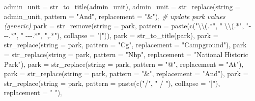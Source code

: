 \documentclass[
]{book}
\newenvironment{Shaded}{\begin{snugshade}}{\end{snugshade}}
\newcommand{\AttributeTok}[1]{\textcolor[rgb]{0.77,0.63,0.00}{#1}}
\newcommand{\CommentTok}[1]{\textcolor[rgb]{0.56,0.35,0.01}{\textit{#1}}}
\newcommand{\FunctionTok}[1]{\textcolor[rgb]{0.00,0.00,0.00}{#1}}
\newcommand{\NormalTok}[1]{#1}
\newcommand{\SpecialCharTok}[1]{\textcolor[rgb]{0.00,0.00,0.00}{#1}}
\newcommand{\StringTok}[1]{\textcolor[rgb]{0.31,0.60,0.02}{#1}}
\begin{document}
\begin{Shaded}
\begin{Highlighting}[]
    \AttributeTok{admin\_unit =} \FunctionTok{str\_to\_title}\NormalTok{(admin\_unit),}
    \AttributeTok{admin\_unit =} \FunctionTok{str\_replace}\NormalTok{(}\AttributeTok{string =}\NormalTok{ admin\_unit,}
                             \AttributeTok{pattern =} \StringTok{"And"}\NormalTok{,}
                             \AttributeTok{replacement =} \StringTok{"\&"}\NormalTok{),}
    \CommentTok{\# update park values (generic)}
    \AttributeTok{park =} \FunctionTok{str\_remove}\NormalTok{(}\AttributeTok{string =}\NormalTok{ park,}
                      \AttributeTok{pattern =} \FunctionTok{paste}\NormalTok{(}\FunctionTok{c}\NormalTok{(}\StringTok{"}\SpecialCharTok{\textbackslash{}\textbackslash{}}\StringTok{(.*"}\NormalTok{, }\StringTok{" }\SpecialCharTok{\textbackslash{}\textbackslash{}}\StringTok{(.*"}\NormalTok{,}
                                        \StringTok{"{-}{-}{-}.*"}\NormalTok{, }\StringTok{" {-}{-}{-}.*"}\NormalTok{,}
                                        \StringTok{",.*"}\NormalTok{), }\AttributeTok{collapse =} \StringTok{"|"}\NormalTok{)),}
    \AttributeTok{park =} \FunctionTok{str\_to\_title}\NormalTok{(park),}
    \AttributeTok{park =} \FunctionTok{str\_replace}\NormalTok{(}\AttributeTok{string =}\NormalTok{ park,}
                       \AttributeTok{pattern =} \StringTok{"Cg"}\NormalTok{,}
                       \AttributeTok{replacement =} \StringTok{"Campground"}\NormalTok{),}
    \AttributeTok{park =} \FunctionTok{str\_replace}\NormalTok{(}\AttributeTok{string =}\NormalTok{ park,}
                       \AttributeTok{pattern =} \StringTok{"Nhp"}\NormalTok{,}
                       \AttributeTok{replacement =} \StringTok{"National Historic Park"}\NormalTok{),}
    \AttributeTok{park =} \FunctionTok{str\_replace}\NormalTok{(}\AttributeTok{string =}\NormalTok{ park,}
                       \AttributeTok{pattern =} \StringTok{"@"}\NormalTok{,}
                       \AttributeTok{replacement =} \StringTok{"At"}\NormalTok{),}
    \AttributeTok{park =} \FunctionTok{str\_replace}\NormalTok{(}\AttributeTok{string =}\NormalTok{ park,}
                       \AttributeTok{pattern =} \StringTok{"\&"}\NormalTok{,}
                       \AttributeTok{replacement =} \StringTok{"And"}\NormalTok{),}
    \AttributeTok{park =} \FunctionTok{str\_replace}\NormalTok{(}\AttributeTok{string =}\NormalTok{ park,}
                       \AttributeTok{pattern =} \FunctionTok{paste}\NormalTok{(}\FunctionTok{c}\NormalTok{(}\StringTok{"/"}\NormalTok{, }\StringTok{" / "}\NormalTok{), }\AttributeTok{collapse =} \StringTok{"|"}\NormalTok{),}
                       \AttributeTok{replacement =} \StringTok{" "}\NormalTok{),}

\end{Highlighting}
\end{Shaded}
\end{document}
